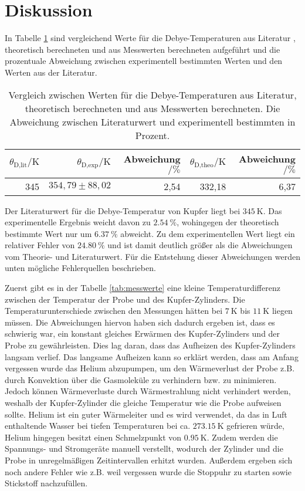 \section{Diskussion}
\label{sec:Diskussion}
In Tabelle \ref{tab:exptheo} sind vergleichend Werte für die Debye-Temperaturen aus Literatur \cite{DebyeTemperaturKupfer}, theoretisch berechneten und aus Messwerten berechneten aufgeführt und die prozentuale Abweichung zwischen experimentell bestimmten Werten und den Werten aus der Literatur.

\begin{table}[htpb]
	\centering
	\caption{Vergleich zwischen Werten für die Debye-Temperaturen aus Literatur, theoretisch berechneten und aus Messwerten berechneten. Die Abweichung zwischen Literaturwert und experimentell bestimmten in Prozent.}
	\label{tab:exptheo}
	\begin{tabular}{rrrrr}
		\toprule
		$\theta_\text{D,lit}/\si{\kelvin}$ & $\theta_\text{D,exp}/\si{\kelvin}$ & Abweichung $/\si{\percent}$ & $\theta_\text{D,theo}/\si{\kelvin}$ & Abweichung $/\si{\percent}$ \\
		\hline
		345 & $354,79 \pm 88,02$ & 2,54 & 332,18 & 6,37 \\
		\bottomrule
	\end{tabular}
\end{table}

Der Literaturwert für die Debye-Temperatur von Kupfer liegt bei $\SI{345}{\kelvin}$. Das experimentelle Ergebnis weicht davon zu $\SI{2,54}{\percent}$, wohingegen der theoretisch bestimmte Wert nur um $\SI{6,37}{\percent}$ abweicht. Zu dem experimentellen Wert liegt ein relativer Fehler von $\SI{24,80}{\percent}$ und ist damit deutlich größer als die Abweichungen vom Theorie- und Literaturwert. Für die Entstehung dieser Abweichungen werden unten mögliche Fehlerquellen beschrieben.

Zuerst gibt es in der Tabelle \ref{tab:messwerte} eine kleine Temperaturdifferenz zwischen der Temperatur der Probe und des Kupfer-Zylinders. Die Temperaturunterschiede zwischen den Messungen hätten bei $\SI{7}{\kelvin}$ bis $\SI{11}{\kelvin}$ liegen müssen. Die Abweichungen hiervon haben sich dadurch ergeben ist, dass es schwierig war, ein konstant gleiches Erwärmen des Kupfer-Zylinders und der Probe zu gewährleisten. Dies lag daran, dass das Aufheizen des Kupfer-Zylinders langsam verlief. Das langsame Aufheizen kann so erklärt werden, dass am Anfang vergessen wurde das Helium abzupumpen, um den Wärmeverlust der Probe z.B. durch Konvektion über die Gasmoleküle zu verhindern bzw. zu minimieren. Jedoch können Wärmeverluste durch Wärmestrahlung nicht verhindert werden, weshalb der Kupfer-Zylinder die gleiche Temperatur wie die Probe aufweisen sollte. Helium ist ein guter Wärmeleiter und es wird verwendet, da das in Luft enthaltende Wasser bei tiefen Temperaturen bei ca. $\SI{273,15}{\kelvin}$ gefrieren würde, Helium hingegen besitzt einen Schmelzpunkt von $\SI{0,95}{\kelvin}$. Zudem werden die Spannungs- und Stromgeräte manuell verstellt, wodurch der Zylinder und die Probe in unregelmäßigen Zeitintervallen erhitzt wurden. Außerdem ergeben sich noch andere Fehler wie z.B. weil vergessen wurde die Stoppuhr zu starten sowie Stickstoff nachzufüllen.

